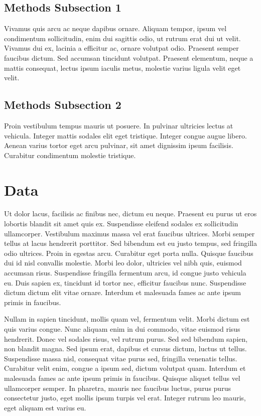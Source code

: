 \documentclass[11pt, onecolumn]{article}
\begin{document}
\subsection{Methods Subsection 1}
Vivamus quis arcu ac neque dapibus ornare. Aliquam tempor, ipsum vel condimentum sollicitudin, enim dui sagittis odio, ut rutrum erat dui ut velit. Vivamus dui ex, lacinia a efficitur ac, ornare volutpat odio. Praesent semper faucibus dictum. Sed accumsan tincidunt volutpat. Praesent elementum, neque a mattis consequat, lectus ipsum iaculis metus, molestie varius ligula velit eget velit. 

\subsection{Methods Subsection 2}
Proin vestibulum tempus mauris ut posuere. In pulvinar ultricies lectus at vehicula. Integer mattis sodales elit eget tristique. Integer congue augue libero. Aenean varius tortor eget arcu pulvinar, sit amet dignissim ipsum facilisis. Curabitur condimentum molestie tristique.

\section{Data}
Ut dolor lacus, facilisis ac finibus nec, dictum eu neque. Praesent eu purus ut eros lobortis blandit sit amet quis ex. Suspendisse eleifend sodales ex sollicitudin ullamcorper. Vestibulum maximus massa vel erat faucibus ultrices. Morbi semper tellus at lacus hendrerit porttitor. Sed bibendum est eu justo tempus, sed fringilla odio ultrices. Proin in egestas arcu. Curabitur eget porta nulla. Quisque faucibus dui id nisl convallis molestie. Morbi leo dolor, ultricies vel nibh quis, euismod accumsan risus. Suspendisse fringilla fermentum arcu, id congue justo vehicula eu. Duis sapien ex, tincidunt id tortor nec, efficitur faucibus nunc. Suspendisse dictum dictum elit vitae ornare. Interdum et malesuada fames ac ante ipsum primis in faucibus.

Nullam in sapien tincidunt, mollis quam vel, fermentum velit. Morbi dictum est quis varius congue. Nunc aliquam enim in dui commodo, vitae euismod risus hendrerit. Donec vel sodales risus, vel rutrum purus. Sed sed bibendum sapien, non blandit magna. Sed ipsum erat, dapibus et cursus dictum, luctus ut tellus. Suspendisse massa nisl, consequat vitae purus sed, fringilla venenatis tellus. Curabitur velit enim, congue a ipsum sed, dictum volutpat quam. Interdum et malesuada fames ac ante ipsum primis in faucibus. Quisque aliquet tellus vel ullamcorper semper. In pharetra, mauris nec faucibus luctus, purus purus consectetur justo, eget mollis ipsum turpis vel erat. Integer rutrum leo mauris, eget aliquam est varius eu.
\end{document}
